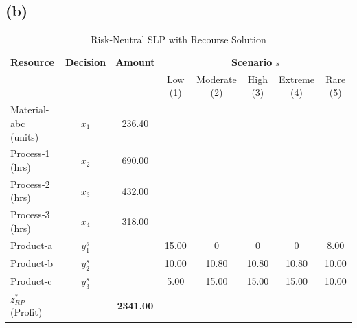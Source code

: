 \documentclass[7pt]{article}
\begin{document}
\subsection*{(b)}
\begin{table}[h!]
    \centering
    \small
    \caption{Risk-Neutral SLP with Recourse Solution}
    \begin{tabular}{l|c|c|ccccc}
        \toprule
        \textbf{Resource}    & \textbf{Decision} & \textbf{Amount}  & \multicolumn{5}{c}{\textbf{Scenario }$s$}                                                    \\
                             &                   &                  & Low (1)                                   & Moderate (2) & High (3) & Extreme (4) & Rare (5) \\
        \midrule
        Material-abc (units) & $x_1$             & 236.40           &                                           &              &          &             &          \\
        Process-1 (hrs)      & $x_2$             & 690.00           &                                           &              &          &             &          \\
        Process-2 (hrs)      & $x_3$             & 432.00           &                                           &              &          &             &          \\
        Process-3 (hrs)      & $x_4$             & 318.00           &                                           &              &          &             &          \\
        Product-a            & $y_1^s$           &                  & 15.00                                     & 0            & 0        & 0           & 8.00     \\
        Product-b            & $y_2^s$           &                  & 10.00                                     & 10.80        & 10.80    & 10.80       & 10.00    \\
        Product-c            & $y_3^s$           &                  & 5.00                                      & 15.00        & 15.00    & 15.00       & 10.00    \\
        \midrule
        $z_{RP}^*$ (Profit)  &                   & \textbf{2341.00} & \multicolumn{5}{l}{}                                                                         \\
        \bottomrule
    \end{tabular}
\end{table}
\end{document}
